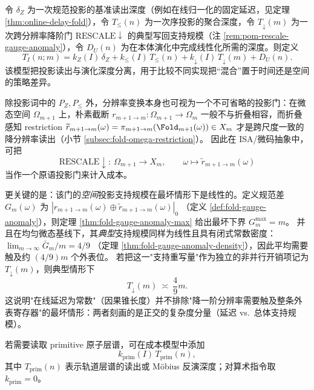 \begin{definition}[成本模型]\label{def:pom-cost}
令 $\delta_Z$ 为一次规范投影的基准读出深度（例如在线归一化的固定延迟，见定理 \ref{thm:online-delay-fold}），令 $T_{\le}(n)$ 为一次序投影的聚合深度，令 $T_{\downarrow}(m)$ 为一次跨分辨率降阶门 $\mathrm{RESCALE}\downarrow$ 的典型写回支持规模（注 \ref{rem:pom-rescale-gauge-anomaly}），令 $D_U(n)$ 为在本体演化中完成线性化所需的深度。则定义
\[
T_I(n;m)=k_Z(I)\,\delta_Z+k_{\le}(I)\,T_{\le}(n)+k_{\downarrow}(I)\,T_{\downarrow}(m)+D_U(n).
\]
该模型把投影读出与演化深度分离，用于比较不同实现把“混合”置于时间还是空间的策略差异。
\end{definition}

\begin{remark}\label{rem:pom-rescale-gauge-anomaly}
除投影词中的 \(P_Z,P_{\le}\) 外，分辨率变换本身也可视为一个不可省略的投影门：在微态空间 \(\Omega_{m+1}\) 上，朴素截断
\(
r_{m+1\to m}:\Omega_{m+1}\to\Omega_m
\)
一般不与折叠相容，而折叠感知 restriction
\(
\widetilde r_{m+1\to m}(\omega)=\pi_{m+1\to m}(\Fold_{m+1}(\omega))\in X_m
\)
才是跨尺度一致的降分辨率读出（小节 \ref{subsec:fold-omega-restriction}）。
因此在 ISA/微码抽象中，可把
$$
\mathrm{RESCALE}\downarrow:\ \Omega_{m+1}\to X_m,\qquad \omega\mapsto \widetilde r_{m+1\to m}(\omega)
$$
当作一个原语投影门来计入成本。
\par
更关键的是：该门的\emph{空间}投影支持规模在最坏情形下是线性的。定义规范差 \(G_m(\omega)\) 为
\(
|r_{m+1\to m}(\omega)\oplus \widetilde r_{m+1\to m}(\omega)|_0
\)
（定义 \ref{def:fold-gauge-anomaly}），则定理 \ref{thm:fold-gauge-anomaly-max} 给出最坏下界 \(G_m^{\max}=m\)。
并且在均匀微态基线下，其\emph{典型}支持规模同样为线性且具有闭式常数密度：
\(
\lim_{m\to\infty}\bar G_m/m=4/9
\)
（定理 \ref{thm:fold-gauge-anomaly-density}），因此平均需要触及约 \((4/9)m\) 个外表位。
若把这一"支持重写量"作为独立的非并行开销项记为 \(T_{\downarrow}(m)\)，则典型情形下
\[
T_{\downarrow}(m)\ \asymp\ \frac{4}{9}m.
\]
这说明"在线延迟为常数"（因果锥长度）并不排除"降一阶分辨率需要触及整条外表寄存器"的最坏情形：两者刻画的是正交的复杂度分量（延迟 vs.\ 总体支持规模）。
\end{remark}

\begin{remark}[原子投影读出成本]\label{rem:pom-cost-prim}
若需要读取 primitive 原子层谱，可在成本模型中添加
\[
k_{\mathrm{prim}}(I)\,T_{\mathrm{prim}}(n),
\]
其中 $T_{\mathrm{prim}}(n)$ 表示轨道层谱的读出或 Möbius 反演深度；对算术指令取 $k_{\mathrm{prim}}=0$。
\end{remark}

